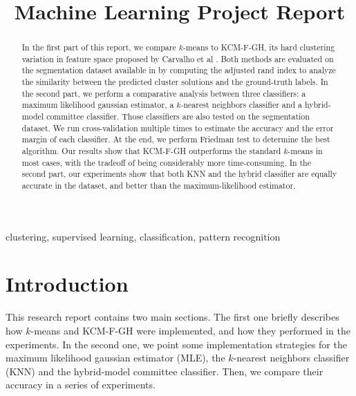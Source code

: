 \documentclass[conference]{IEEEtran}
\begin{document}
\title{Machine Learning Project Report}

\author{
}


\maketitle

\begin{abstract}
In the first part of this report, we compare $k$-means to KCM-F-GH, its hard clustering variation in feature space proposed by Carvalho et al \cite{b1}.
Both methods are evaluated on the segmentation dataset available in \cite{b2} by 
computing the adjusted rand index to analyze the similarity between the predicted cluster solutions and the ground-truth labels.
In the second part, we perform a comparative analysis between three classifiers: a maximum likelihood gaussian estimator, a $k$-nearest neighbors classifier and a hybrid-model committee classifier.
Those classifiers are also tested on the segmentation dataset.
We run cross-validation multiple times to estimate the accuracy and the error margin of each classifier.
At the end, we perform Friedman test to determine the best algorithm.
Our results show that KCM-F-GH outperforms the standard $k$-means in most cases, with the tradeoff of being considerably more time-consuming.
In the second part, our experiments show that both KNN and the hybrid classifier are equally accurate in the dataset, and better than the maximum-likelihood estimator.


\end{abstract}

\begin{IEEEkeywords}
clustering, supervised learning, classification, pattern recognition
\end{IEEEkeywords}

\section{Introduction}
This research report contains two main sections.
The first one briefly describes how $k$-means and KCM-F-GH were implemented, and how they performed in the experiments.
In the second one, we point some implementation strategies for the maximum likelihood gaussian estimator (MLE), the $k$-nearest neighbors classifier (KNN) and the hybrid-model committee classifier. Then, we compare their accuracy in a series of experiments.
\end{document}

